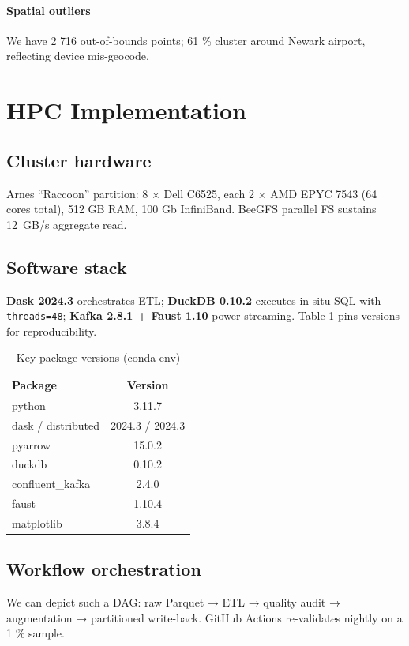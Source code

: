 \documentclass[conference]{IEEEtran}
\begin{document}
\paragraph*{Spatial outliers}
We have 2 716 out-of-bounds
points; 61 \% cluster around Newark
airport, reflecting device mis-geocode.

\section{HPC Implementation}\label{sec:method}
\subsection{Cluster hardware}
Arnes “Raccoon” partition: 8 × Dell C6525, each
2 × AMD EPYC 7543 (64 cores total), 512 GB RAM, 100 Gb InfiniBand.
BeeGFS parallel FS sustains \SI{12}{GB/s} aggregate read.

\subsection{Software stack}
\textbf{Dask 2024.3} orchestrates ETL;
\textbf{DuckDB 0.10.2} executes in-situ SQL with \verb|threads=48|;
\textbf{Kafka 2.8.1 + Faust 1.10} power streaming.
Table \ref{tab:versions} pins versions for reproducibility.

\begin{table}[htbp]
  \caption{Key package versions (conda env)}
  \label{tab:versions}
  \centering
  \begin{tabular}{lc}
    \toprule
    Package & Version \\ \midrule
    python & 3.11.7\\
    dask / distributed & 2024.3 / 2024.3\\
    pyarrow & 15.0.2\\
    duckdb & 0.10.2\\
    confluent\_kafka & 2.4.0\\
    faust & 1.10.4\\
    matplotlib & 3.8.4\\
    \bottomrule
  \end{tabular}
\end{table}

\subsection{Workflow orchestration}
We can depict such a DAG: raw Parquet → ETL → quality audit →
augmentation → partitioned write-back.
GitHub Actions re-validates nightly on a 1 \% sample.
\end{document}
